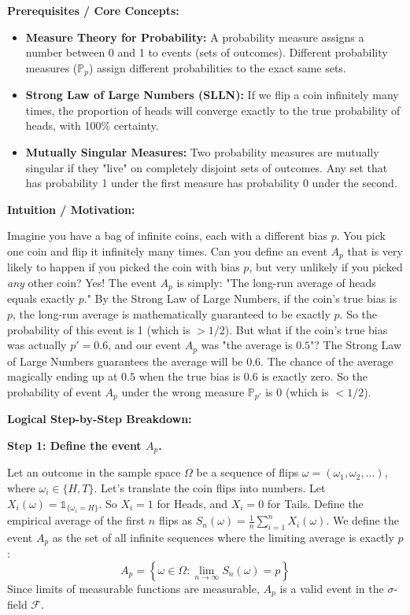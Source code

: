 \begin{solution}
\textbf{Prerequisites / Core Concepts:}
\begin{itemize}
    \item \textbf{Measure Theory for Probability:} A probability measure assigns a number between 0 and 1 to events (sets of outcomes). Different probability measures ($\mathbb{P}_p$) assign different probabilities to the exact same sets.
    \item \textbf{Strong Law of Large Numbers (SLLN):} If we flip a coin infinitely many times, the proportion of heads will converge exactly to the true probability of heads, with 100\% certainty.
    \item \textbf{Mutually Singular Measures:} Two probability measures are mutually singular if they "live" on completely disjoint sets of outcomes. Any set that has probability 1 under the first measure has probability 0 under the second.
\end{itemize}

\textbf{Intuition / Motivation:}

Imagine you have a bag of infinite coins, each with a different bias $p$. You pick one coin and flip it infinitely many times. Can you define an event $A_p$ that is very likely to happen if you picked the coin with bias $p$, but very unlikely if you picked \textit{any} other coin?
Yes! The event $A_p$ is simply: "The long-run average of heads equals exactly $p$."
By the Strong Law of Large Numbers, if the coin's true bias is $p$, the long-run average is mathematically guaranteed to be exactly $p$. So the probability of this event is 1 (which is $> 1/2$).
But what if the coin's true bias was actually $p' = 0.6$, and our event $A_p$ was "the average is $0.5$"? The Strong Law of Large Numbers guarantees the average will be $0.6$. The chance of the average magically ending up at $0.5$ when the true bias is $0.6$ is exactly zero. So the probability of event $A_p$ under the wrong measure $\mathbb{P}_{p'}$ is 0 (which is $< 1/2$).

\textbf{Logical Step-by-Step Breakdown:}

\textbf{Step 1: Define the event $A_p$.}

Let an outcome in the sample space $\Omega$ be a sequence of flips $\omega = (\omega_1, \omega_2, \dots)$, where $\omega_i \in \{H, T\}$.
Let's translate the coin flips into numbers. Let $X_i(\omega) = \mathbb{1}_{\{\omega_i = H\}}$. So $X_i = 1$ for Heads, and $X_i = 0$ for Tails.
Define the empirical average of the first $n$ flips as $S_n(\omega) = \frac{1}{n} \sum_{i=1}^n X_i(\omega)$.
We define the event $A_p$ as the set of all infinite sequences where the limiting average is exactly $p$:
\[ A_p = \left\{ \omega \in \Omega : \lim_{n \to \infty} S_n(\omega) = p \right\} \]
Since limits of measurable functions are measurable, $A_p$ is a valid event in the $\sigma$-field $\mathcal{F}$.


\end{solution}

